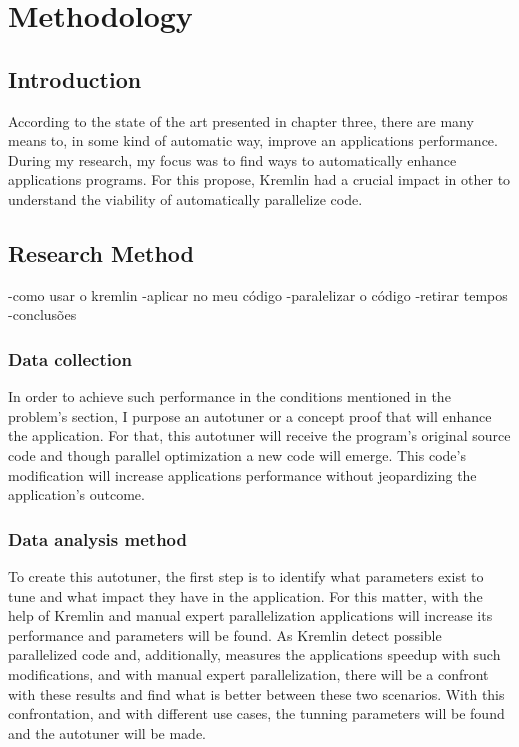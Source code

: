 \chapter{Methodology}\label{chap:chap4}

\section*{}



\section{Introduction}

According to the state of the art presented in chapter three, there are many means to, in some kind of automatic way, improve an applications performance. During my research, my focus was to find ways to automatically enhance applications programs. For this propose, Kremlin had a crucial impact in other to understand the viability of automatically parallelize code.

\section{Research Method}


-como usar o kremlin
-aplicar no meu código
-paralelizar o código
-retirar tempos
-conclusões

\subsection{Data collection}

In order to achieve such performance in the conditions mentioned in the problem's section, I purpose an autotuner or a concept proof that will enhance the application. For that, this autotuner will receive the program's original source code and though parallel optimization a new code will emerge. This code's modification will increase applications performance without jeopardizing the application's outcome.

\subsection{Data analysis method}

To create this autotuner, the first step is to identify what parameters exist to tune and what impact they have in the application. For this matter, with the help of Kremlin and manual expert parallelization applications will increase its performance and parameters will be found. As Kremlin detect possible parallelized code and, additionally, measures the applications speedup with such modifications, and with manual expert parallelization, there will be a confront with these results and find what is better between these two scenarios. With this confrontation, and with different use cases, the tunning parameters will be found and the autotuner will be made.

